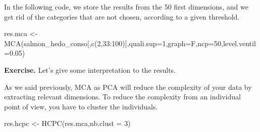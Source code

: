 \documentclass[
]{book}
\newenvironment{Shaded}{\begin{snugshade}}{\end{snugshade}}
\newcommand{\AttributeTok}[1]{\textcolor[rgb]{0.77,0.63,0.00}{#1}}
\newcommand{\DecValTok}[1]{\textcolor[rgb]{0.00,0.00,0.81}{#1}}
\newcommand{\FloatTok}[1]{\textcolor[rgb]{0.00,0.00,0.81}{#1}}
\newcommand{\FunctionTok}[1]{\textcolor[rgb]{0.00,0.00,0.00}{#1}}
\newcommand{\NormalTok}[1]{#1}
\newcommand{\OtherTok}[1]{\textcolor[rgb]{0.56,0.35,0.01}{#1}}
\newcommand{\SpecialCharTok}[1]{\textcolor[rgb]{0.00,0.00,0.00}{#1}}
\newcommand{\StringTok}[1]{\textcolor[rgb]{0.31,0.60,0.02}{#1}}
\begin{document}
In the following code, we store the results from the 50 first dimensions, and we get rid of the categories that are not chosen, according to a given threshold.

\begin{Shaded}
\begin{Highlighting}[]
\NormalTok{res.mca }\OtherTok{\textless{}{-}} \FunctionTok{MCA}\NormalTok{(salmon\_hedo\_conso[,}\FunctionTok{c}\NormalTok{(}\DecValTok{2}\NormalTok{,}\DecValTok{33}\SpecialCharTok{:}\DecValTok{100}\NormalTok{)],}\AttributeTok{quali.sup=}\DecValTok{1}\NormalTok{,}\AttributeTok{graph=}\NormalTok{F,}\AttributeTok{ncp=}\DecValTok{50}\NormalTok{,}\AttributeTok{level.ventil=}\FloatTok{0.05}\NormalTok{)}
\end{Highlighting}
\end{Shaded}

\textbf{Exercise. }Let's give some interpretation to the results.

\begin{Shaded}
\end{Shaded}

As we said previously, MCA as PCA will reduce the complexity of your data by extracting relevant dimensions. To reduce the complexity from an individual point of view, you have to cluster the individuals.

\begin{Shaded}
\begin{Highlighting}[]
\NormalTok{res.hcpc }\OtherTok{\textless{}{-}} \FunctionTok{HCPC}\NormalTok{(res.mca,}\AttributeTok{nb.clust =} \DecValTok{3}\NormalTok{)}
\end{Highlighting}
\end{Shaded}
\end{document}
